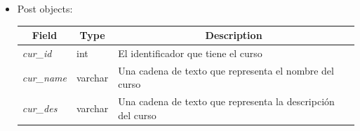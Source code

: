 \documentclass{article}
\begin{document}
\begin{enumerate}
\begin{itemize}
        \item Post objects:
        \begin{table}[H] \centering \begin{tabular}{|l|l|l|} \hline
        \multicolumn{1}{|c|}{\textbf{Field}} &
        \multicolumn{1}{c|}{\textbf{Type}} &
        \multicolumn{1}{c|}{\textbf{Description}} \\ \hline \textit{cur\_id} &
        int & El identificador que tiene el curso \\ \hline \textit{cur\_name} &
        varchar & Una cadena de texto que representa el nombre del curso \\
        \hline \textit{cur\_des} & varchar & Una cadena de texto que representa
        la descripción del curso \\ \hline \end{tabular} \end{table}
    \end{itemize}


\end{enumerate}
\end{document}
